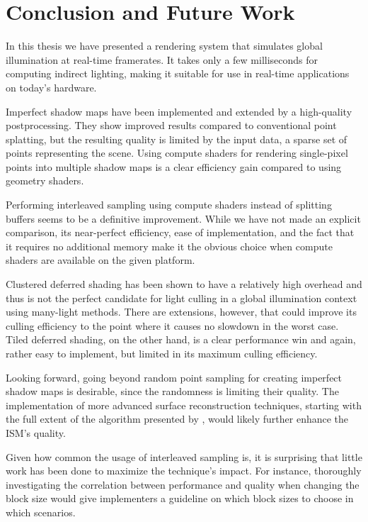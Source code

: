 

\chapter{Conclusion and Future Work}
\label{chap:conclusion}

In this thesis we have presented a rendering system that simulates global illumination at real-time framerates. It takes only a few milliseconds for computing indirect lighting, making it suitable for use in real-time applications on today's hardware.

Imperfect shadow maps have been implemented and extended by a high-quality postprocessing. They show improved results compared to conventional point splatting, but the resulting quality is limited by the input data, a sparse set of points representing the scene. Using compute shaders for rendering single-pixel points into multiple shadow maps is a clear efficiency gain compared to using geometry shaders.

Performing interleaved sampling using compute shaders instead of splitting buffers seems to be a definitive improvement. While we have not made an explicit comparison, its near-perfect efficiency, ease of implementation, and the fact that it requires no additional memory make it the obvious choice when compute shaders are available on the given platform.

Clustered deferred shading has been shown to have a relatively high overhead and thus is not the perfect candidate for light culling in a global illumination context using many-light methods. There are extensions, however, that could improve its culling efficiency to the point where it causes no slowdown in the worst case. Tiled deferred shading, on the other hand, is a clear performance win and again, rather easy to implement, but limited in its maximum culling efficiency.


Looking forward, going beyond random point sampling for creating imperfect shadow maps is desirable, since the randomness is limiting their quality. The implementation of more advanced surface reconstruction techniques, starting with the full extent of the algorithm presented by \citet{Marroquim:2007:reconstruction}, would likely further enhance the ISM's quality.

Given how common the usage of interleaved sampling is, it is surprising that little work has been done to maximize the technique's impact. For instance, thoroughly investigating the correlation between performance and quality when changing the block size would give implementers a guideline on which block sizes to choose in which scenarios.

